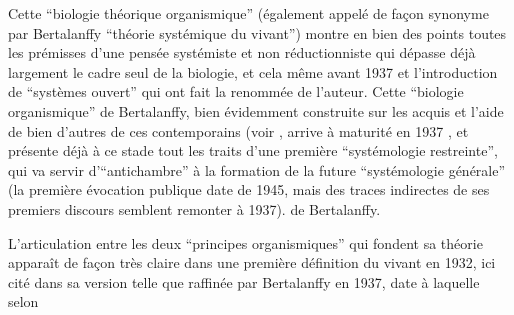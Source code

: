 Cette \enquote{biologie théorique organismique} (également appelé de façon synonyme par Bertalanffy \enquote{théorie systémique du vivant}) montre en bien des points toutes les prémisses d'une pensée systémiste et non réductionniste qui dépasse déjà largement le cadre seul de la biologie, et cela même avant 1937 et l'introduction de \enquote{systèmes ouvert} \autocite[499]{Pouvreau2013} qui ont fait la renommée de l'auteur.  Cette \enquote{biologie organismique} de Bertalanffy, bien évidemment construite sur les acquis et l'aide de bien d'autres de ces contemporains (voir \autocite{Pouvreau2013}, arrive à maturité en 1937 \autocite[14]{Pouvreau2013}, et présente déjà à ce stade tout les traits d'une première \enquote{systémologie restreinte}, qui va servir d'\enquote{antichambre} à la formation de la future \enquote{systémologie générale} (la première évocation publique date de 1945, mais des traces indirectes de ses premiers discours semblent remonter à 1937).\autocite[670]{Pouvreau2013} de Bertalanffy.


L'articulation entre les deux \enquote{principes organismiques} qui fondent sa théorie apparaît de façon très claire dans une première définition du vivant en 1932, ici cité dans sa version telle que raffinée par Bertalanffy en 1937, date à laquelle selon


